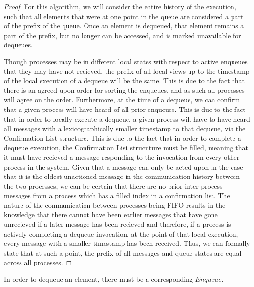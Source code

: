 \documentclass[a4paper,anonymous,USenglish]{lipics-v2021} %
\theoremstyle{definition}
\begin{document}
\begin{proof}
  For this algorithm, we will consider the entire history of the execution, such that all elements that were at one point in the queue are considered a part of the prefix of the queue. Once an element is dequeued, that element remains a part of the prefix, but no longer can be accessed, and is marked unavailable for dequeues.
  
Though processes may be in different local states with respect to active enqueues that they may have not recieved, the prefix of all local views up to the timestamp of the local execution of a dequeue will be the same. This is due to the fact that there is an agreed upon order for sorting the enqueues, and as such all processes will agree on the order. Furthermore, at the time of a dequeue, we can confirm that a given process will have heard of all prior enqueues. This is due to the fact that in order to locally execute a dequeue, a given process will have to have heard all messages with a lexicographically smaller timestamp to that dequeue, via the Confirmation List structure. This is due to the fact that in order to complete a dequeue execution, the Confirmation List strucuture must be filled, meaning that it must have recieved a message responding to the invocation from every other process in the system. Given that a message can only be acted upon in the case that it is the oldest unactioned message in the communication history between the two processes, we can be certain that there are no prior inter-process messages from a process which has a filled index in a confirmation list. The nature of the communication between processes being FIFO results in the knowledge that there cannot have been earlier messages that have gone unrecieved if a later message has been recieved and therefore, if a process is actively completing a dequeue invocation, at the point of that local execution, every message with a smaller timestamp has been received. Thus, we can formally state that at such a point, the prefix of all messages and queue states are equal across all processes.
\end{proof}

\begin{lemma}
In order to dequeue an element, there must be a corresponding $Enqueue$.
\end{lemma}
\end{document}
